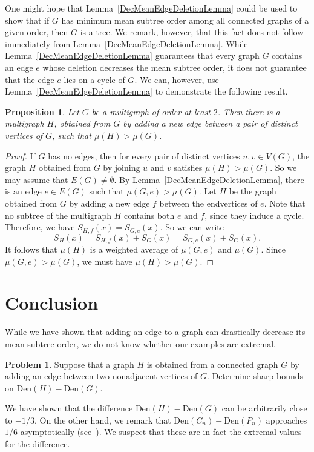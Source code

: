 \documentclass[12pt]{article}
\newcommand{\den}{\mbox{Den}}
\newtheorem{proposition}[theorem]{Proposition}
\theoremstyle{definition}
\newtheorem{problem}{Problem}
\begin{document}
One might hope that Lemma~\ref{DecMeanEdgeDeletionLemma} could be used to show that if $G$ has minimum mean subtree order among all connected graphs of a given order, then $G$ is a tree. We remark, however, that this fact does not follow immediately from Lemma~\ref{DecMeanEdgeDeletionLemma}.  While Lemma~\ref{DecMeanEdgeDeletionLemma} guarantees that every graph $G$ contains an edge $e$ whose deletion decreases the mean subtree order, it does not guarantee that the edge $e$ lies on a cycle of $G$.
We can, however, use Lemma~\ref{DecMeanEdgeDeletionLemma} to demonstrate the following result.

\begin{proposition}
Let $G$ be a multigraph of order at least $2$.  Then there is a multigraph $H$, obtained from $G$ by adding a new edge between a pair of distinct vertices of $G$, such that $\mu(H)>\mu(G)$.
\end{proposition}
\begin{proof}
If $G$ has no edges, then for every pair of distinct vertices $u,v\in V(G)$, the graph $H$ obtained from $G$ by joining $u$ and $v$ satisfies $\mu(H)>\mu(G)$.  So we may assume that $E(G)\neq \emptyset$.  By Lemma~\ref{DecMeanEdgeDeletionLemma}, there is an edge $e\in E(G)$ such that $\mu(G,e)>\mu(G)$.  Let $H$ be the graph obtained from $G$ by adding a new edge $f$ between the endvertices of $e$.  Note that no subtree of the multigraph $H$ contains both $e$ and $f$, since they induce a cycle. Therefore, we have $S_{H,f}(x)=S_{G,e}(x)$.  So we can write
\[
S_H(x)=S_{H,f}(x)+S_{G}(x)=S_{G,e}(x)+S_G(x).
\]
It follows that $\mu(H)$ is a weighted average of $\mu(G,e)$ and $\mu(G)$. Since $\mu(G,e)>\mu(G)$, we must have $\mu(H)>\mu(G)$.
\end{proof}
\section{Conclusion}

While we have shown that adding an edge to a graph can drastically decrease its mean subtree order, we do not know whether our examples are extremal.

\begin{problem}
Suppose that a graph $H$ is obtained from a connected graph $G$ by adding an edge between two nonadjacent vertices of $G$.  Determine sharp bounds on $\den(H)-\den(G).$
\end{problem}

\noindent
We have shown that the difference $\den(H)-\den(G)$ can be arbitrarily close to $-1/3$.  On the other hand, we remark that $\den(C_n)-\den(P_n)$ approaches $1/6$ asymptotically (see~\cite[Corollary 3.2]{ChinGordonMacpheeVincent2018}).  We suspect that these are in fact the extremal values for the difference.
\end{document}
